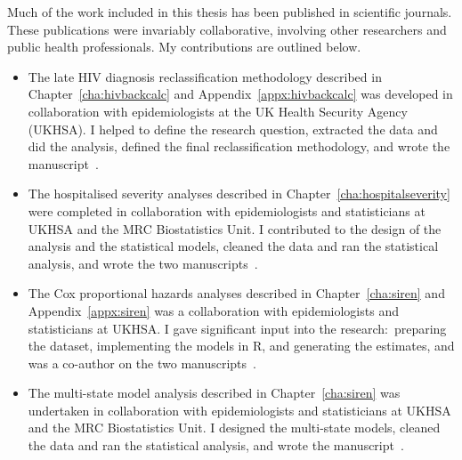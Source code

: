
\begin{preface}

    Much of the work included in this thesis has been published in scientific journals. These publications were invariably collaborative, involving other researchers and public health professionals. My contributions are outlined below.
    \begin{itemize}
        \item The late HIV diagnosis reclassification methodology described in Chapter~\ref{cha:hivbackcalc} and Appendix~\ref{appx:hivbackcalc} was developed in collaboration with epidemiologists at the UK Health Security Agency (UKHSA)\@. I helped to define the research question, extracted the data and did the analysis, defined the final reclassification methodology, and wrote the manuscript~\parencite{Kirwan2022-za}.
        \item The hospitalised severity analyses described in Chapter~\ref{cha:hospitalseverity} were completed in collaboration with epidemiologists and statisticians at UKHSA and the MRC Biostatistics Unit\@. I contributed to the design of the analysis and the statistical models, cleaned the data and ran the statistical analysis, and wrote the two manuscripts~\parencite{Kirwan2022-ka, Kirwan2021-sw}.
        \item The Cox proportional hazards analyses described in Chapter~\ref{cha:siren} and Appendix~\ref{appx:siren} was a collaboration with epidemiologists and statisticians at UKHSA\@. I gave significant input into the research:\ preparing the dataset, implementing the models in R, and generating the estimates, and was a co-author on the two manuscripts~\parencite{Hall2022-ep, Hall2024-ai}.
        \item The multi-state model analysis described in Chapter~\ref{cha:siren} was undertaken in collaboration with epidemiologists and statisticians at UKHSA and the MRC Biostatistics Unit. I designed the multi-state models, cleaned the data and ran the statistical analysis, and wrote the manuscript~\parencite{Kirwan2024-hj}.
    \end{itemize}

\end{preface}